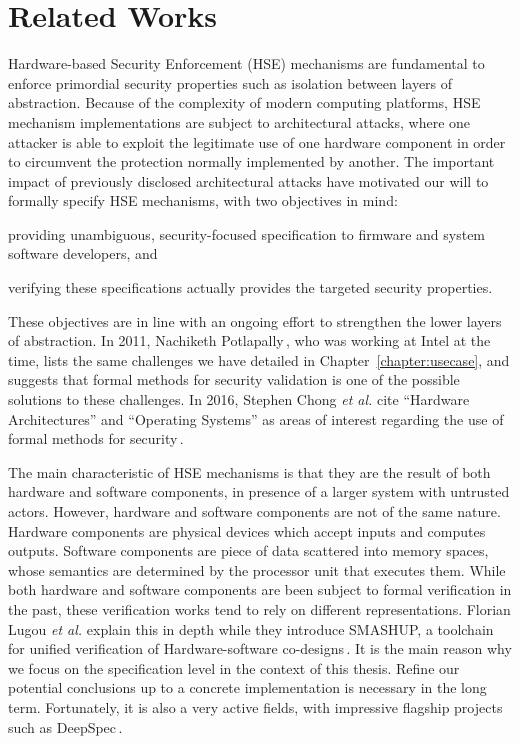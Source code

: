 \chapter{Related Works}
\label{chapter:relatedwork}

Hardware-based Security Enforcement (HSE) mechanisms are fundamental to enforce
primordial security properties such as isolation between layers of abstraction.
%
Because of the complexity of modern computing platforms, HSE mechanism
implementations are subject to architectural attacks, where one attacker is able
to exploit the legitimate use of one hardware component in order to circumvent
the protection normally implemented by another.
%
The important impact of previously disclosed architectural attacks have
motivated our will to formally specify HSE mechanisms, with two objectives in
mind:
%
\begin{inparaenum}[(1)]
\item providing unambiguous, security-focused specification to firmware and
  system software developers, and
%
\item verifying these specifications actually provides the targeted security
  properties.
\end{inparaenum}
%
These objectives are in line with an ongoing effort to strengthen the lower
layers of abstraction.
%
In 2011, Nachiketh Potlapally\,\cite{potlapally2011hardwaresecurity}, who was
working at Intel at the time, lists the same challenges we have detailed in
Chapter~\ref{chapter:usecase}, and suggests that formal methods for security
validation is one of the possible solutions to these challenges.
%
In 2016, Stephen Chong \emph{et al.} cite ``Hardware Architectures'' and
``Operating Systems'' as areas of interest regarding the use of formal methods
for security\,\cite{chong2016report}.

The main characteristic of HSE mechanisms is that they are the result of both
hardware and software components, in presence of a larger system with untrusted
actors.
%
However, hardware and software components are not of the same nature.
%
Hardware components are physical devices which accept inputs and computes
outputs.
%
Software components are piece of data scattered into memory spaces, whose
semantics are determined by the processor unit that executes them.
%
While both hardware and software components are been subject to formal
verification in the past, these verification works tend to rely on different
representations.
%
Florian Lugou \emph{et al.} explain this in depth while they introduce SMASHUP,
a toolchain for unified verification of Hardware-software
co-designs\,\cite{lugou2017smashup}.
%
It is the main reason why we focus on the specification level in the context of
this thesis.
%
Refine our potential conclusions up to a concrete implementation is necessary in
the long term.
%
Fortunately, it is also a very active fields, with impressive flagship projects
such as DeepSpec\,\cite{appel2017deepspec}.

